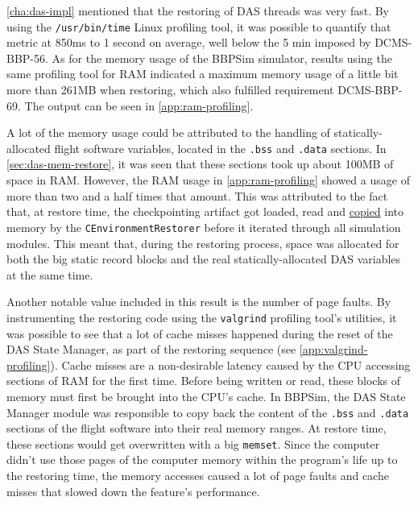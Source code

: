 {\autoref{cha:das-impl} mentioned that the restoring of DAS threads was very fast. By using the \texttt{/usr/bin/time} Linux profiling tool, it was possible to quantify that metric at  850ms to 1 second on average, well below the 5 min imposed by DCMS-BBP-56. As for the memory usage of the BBPSim simulator, results using the same profiling tool for RAM indicated a maximum memory usage of a little bit more than 261MB when restoring, which also fulfilled requirement DCMS-BBP-69. The output can be seen in \autoref{app:ram-profiling}. 

A lot of the memory usage could be attributed to the handling of statically-allocated flight software variables, located in the \texttt{.bss} and \texttt{.data} sections. In \autoref{sec:das-mem-restore}, it was seen that these sections took up about 100MB of space in RAM. However, the RAM usage in \autoref{app:ram-profiling} showed a usage of more than two and a half times that amount. This was attributed to the fact that, at restore time, the checkpointing artifact got loaded, read and \ul{copied} into memory by the \texttt{CEnvironmentRestorer} before it iterated through all simulation modules. This meant that, during the restoring process, space was allocated for both the big static record blocks and the real statically-allocated DAS variables at the same time. 

Another notable value included in this result is the number of page faults. By instrumenting the restoring code using the \texttt{valgrind} profiling tool's utilities, it was possible to see that a lot of cache misses happened during the reset of the DAS State Manager, as part of the restoring sequence (see \autoref{app:valgrind-profiling}). Cache misses are a non-desirable latency caused by the CPU accessing sections of RAM for the first time. Before being written or read, these blocks of memory must first be brought into the CPU's cache\cite{misc:cache-misses}. In BBPSim, the DAS State Manager module was responsible to copy back the content of the \texttt{.bss} and \texttt{.data} sections of the flight software into their real memory ranges. At restore time, these sections would get overwritten with a big \texttt{memset}. Since the computer didn't use those pages of the computer memory within the program's life up to the restoring time, the memory accesses caused a lot of page faults and cache misses that slowed down the feature's performance.

}